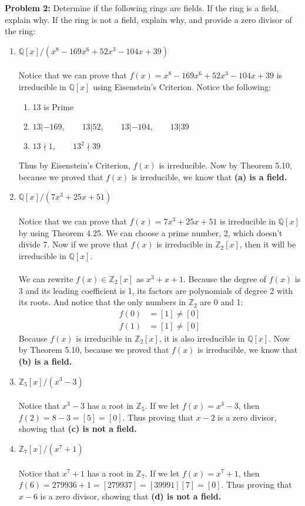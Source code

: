 \documentclass[12pt]{article}
\begin{document}
\noindent \textbf{Problem 2: }Determine if the following rings are fields. If the ring is a field, explain why.
If the ring is not a field, explain why, and provide a zero divisor of the ring:
	\begin{enumerate}[label = (\alph*)]
		\item $\mathbb{Q}[x]/(x^8 - 169x^6 + 52x^3 - 104x + 39)$
		\\ \\
		Notice that we can prove that $f(x) = x^8 - 169x^6 + 52x^3 - 104x + 39$ is irreducible in $\mathbb{Q}[x]$ using Eisenstein's Criterion.  Notice the following:
			\begin{enumerate}[label = (\alph*)]
				\item 13 is Prime 
				\item $13| -169, \qquad 13|52, \qquad 13|-104, \qquad 13|39$
				\item $13 \nmid 1, \qquad 13^2 \nmid 39$
			\end{enumerate}
		Thus by Eisenstein's Criterion, $f(x)$ is irreducible. Now by Theorem 5.10, because we proved that $f(x)$ is irreducible, we know that \textbf{(a) is a field.}
		\item $\mathbb{Q}[x]/(7x^3 + 25x + 51)$
		\\ \\
		Notice that we can prove that $f(x) = 7x^3 + 25x + 51$ is irreducible in $\mathbb{Q}[x]$ by using Theorem 4.25.  We can choose a prime number, 2, which doesn't divide 7. Now if we prove that $f(x)$ is irreducible in $\mathbb{Z}_2[x]$, then it will be irreducible in $\mathbb{Q}[x]$.
		\\ \\
		We can rewrite $f(x) \in \mathbb{Z}_2[x]$ as $x^3 + x + 1$. 
		Because the degree of $f(x)$ is 3 and its leading coefficient is 1, its factors are polynomials of degree 2 with its roots. And notice that the only numbers in $\mathbb{Z}_2$ are 0 and 1:
			\begin{align*}
				f(0) &= [1] \not = [0] \\
				f(1) &= [1] \not = [0]
			\end{align*}
		Because $f(x)$ is irreducible in $\mathbb{Z}_2[x]$, it is also irreducible in $\mathbb{Q}[x]$. Now by Theorem 5.10, because we proved that $f(x)$ is irreducible, we know that \textbf{(b) is a field.}  
		\item $\mathbb{Z}_5[x]/(x^3 - 3)$
		\\ \\
		Notice that $x^3 - 3$ has a root in $\mathbb{Z}_5$. If we let $f(x) = x^3 - 3$, then $f(2) = 8 - 3 = [5] = [0]$.  Thus proving that $x - 2$ is a zero divisor, showing that \textbf{(c) is not a field.}
		\item $\mathbb{Z}_7[x]/(x^7 + 1)$
		\\ \\
		Notice that $x^7 + 1$ has a root in $\mathbb{Z}_7$. If we let $f(x) = x^7 + 1$, then $f(6) = 279936 + 1 = [279937] = [39991][7] = [0]$.  Thus proving that $x - 6$ is a zero divisor, showing that \textbf{(d) is not a field.}
	\end{enumerate}
\end{document}
